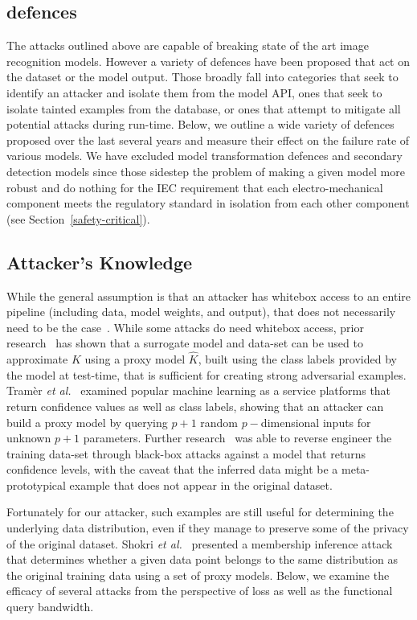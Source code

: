 \documentclass[journal]{IEEEtran}
\begin{document}
\subsection{defences}
The attacks outlined above are capable of breaking state of the art image recognition models.
However a variety of defences have been proposed that act on the dataset or the model output.
Those broadly fall into categories that seek to identify an attacker and isolate them from the model API, ones that seek to isolate tainted examples from the database, or ones that attempt to mitigate all potential attacks during run-time.
Below, we outline a wide variety of defences proposed over the last several years and measure their effect on the failure rate of various models.
We have excluded model transformation defences and secondary detection models since those sidestep the problem of making a given model more robust and do nothing for the IEC requirement that each electro-mechanical component meets the regulatory standard in isolation from each other component (see Section~\ref{safety-critical}).

\subsection{Attacker's Knowledge}
 While the general assumption is that an attacker has whitebox access to an entire pipeline (including data, model weights, and output), that does not necessarily need to be the case~\cite{hopskipjump,chakraborty_adversarial_2018}.
While some attacks do need whitebox access, prior research~\cite{hopskipjump,nelson2010behavior} has shown that a surrogate model and data-set can be used to approximate $K$ using a proxy model $\widehat{K}$, built using the class labels provided by the model at test-time, that is sufficient for creating strong adversarial examples.
Tram\`er \textit{et al.}~\cite{tramer2016stealing} examined popular machine learning as a service platforms that return confidence values as well as class labels, showing that an attacker can build a proxy model by querying $ p + 1$ random $p-$dimensional inputs for unknown $p+1$ parameters.
Further research~\cite{fredrikson_model_2015} was able to reverse engineer the training data-set through black-box attacks against a model that returns confidence levels, with the caveat that the inferred data might be a meta-prototypical example that does not appear in the original dataset.

Fortunately for our attacker, such examples are still useful for determining the underlying data distribution, even if they manage to preserve some of the privacy of the original dataset.
Shokri \textit{et al.}~\cite{shokri2017membership} presented a membership inference attack that determines whether a given data point belongs to the same distribution as the original training data using a set of proxy models.
Below, we examine the efficacy of several attacks from the perspective of loss as well as the functional query bandwidth.
\end{document}
